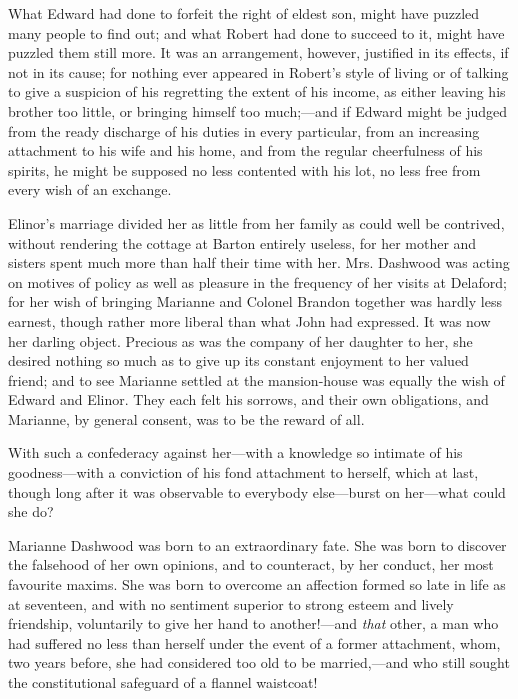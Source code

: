 What Edward had done to forfeit the right of eldest son, might have puzzled many people to find out; and what Robert had done to succeed to it, might have puzzled them still more. It was an arrangement, however, justified in its effects, if not in its cause; for nothing ever appeared in Robert's style of living or of talking to give a suspicion of his regretting the extent of his income, as either leaving his brother too little, or bringing himself too much;---and if Edward might be judged from the ready discharge of his duties in every particular, from an increasing attachment to his wife and his home, and from the regular cheerfulness of his spirits, he might be supposed no less contented with his lot, no less free from every wish of an exchange.

Elinor's marriage divided her as little from her family as could well be contrived, without rendering the cottage at Barton entirely useless, for her mother and sisters spent much more than half their time with her. Mrs. Dashwood was acting on motives of policy as well as pleasure in the frequency of her visits at Delaford; for her wish of bringing Marianne and Colonel Brandon together was hardly less earnest, though rather more liberal than what John had expressed. It was now her darling object. Precious as was the company of her daughter to her, she desired nothing so much as to give up its constant enjoyment to her valued friend; and to see Marianne settled at the mansion-house was equally the wish of Edward and Elinor. They each felt his sorrows, and their own obligations, and Marianne, by general consent, was to be the reward of all.

With such a confederacy against her---with a knowledge so intimate of his goodness---with a conviction of his fond attachment to herself, which at last, though long after it was observable to everybody else---burst on her---what could she do?

Marianne Dashwood was born to an extraordinary fate. She was born to discover the falsehood of her own opinions, and to counteract, by her conduct, her most favourite maxims. She was born to overcome an affection formed so late in life as at seventeen, and with no sentiment superior to strong esteem and lively friendship, voluntarily to give her hand to another!---and {\em that} other, a man who had suffered no less than herself under the event of a former attachment, whom, two years before, she had considered too old to be married,---and who still sought the constitutional safeguard of a flannel waistcoat!


